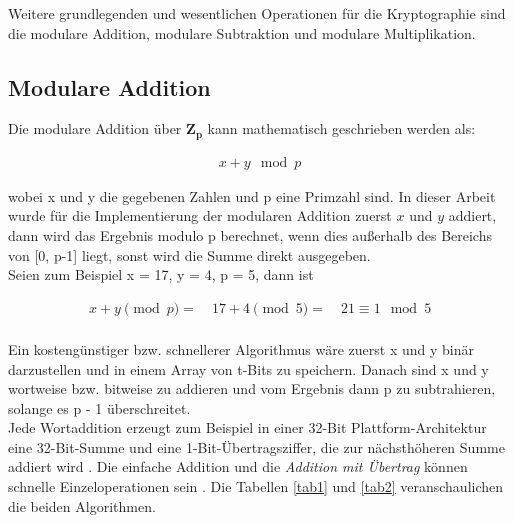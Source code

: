 Weitere grundlegenden und wesentlichen Operationen für die
Kryptographie sind die modulare Addition, modulare Subtraktion und modulare Multiplikation. 


\subsection{Modulare Addition}


Die modulare Addition über $ \mathbf{Z_p} $ kann mathematisch
geschrieben werden als:

\begin{ceqn}
\begin{align*}
    x + y \mod p 
\end{align*}
\end{ceqn} wobei x und y die
gegebenen Zahlen und p eine Primzahl sind. In dieser Arbeit wurde für die Implementierung der modularen Addition zuerst $ x $ und $ y $ 
addiert, dann wird das Ergebnis modulo p berechnet, wenn dies außerhalb des Bereichs von [0, p-1] liegt, sonst wird die Summe direkt ausgegeben. \\

Seien zum Beispiel x = 17, y = 4, p = 5, dann ist
\begin{ceqn}

\begin{align*}
   x + y \pmod p = \quad 17 + 4 \pmod 5 = \quad 21 \equiv 1 \mod 5 \\
\end{align*}
\end{ceqn}
Ein kostengünstiger bzw. schnellerer Algorithmus wäre zuerst x und y binär darzustellen und in einem Array von t-Bits zu speichern.
Danach sind x und y wortweise bzw.
bitweise zu addieren und vom Ergebnis dann p zu subtrahieren, solange es p - 1 überschreitet. \\

Jede Wortaddition erzeugt zum Beispiel in einer 32-Bit Plattform-Architektur eine 32-Bit-Summe und eine 1-Bit-Übertragsziffer, die zur
nächsthöheren Summe addiert wird \cite{nist}. Die einfache Addition und die \textit{Addition mit Übertrag} können schnelle Einzeloperationen sein \cite{Hossain2019}. Die Tabellen \ref{tab1} und \ref{tab2} veranschaulichen die beiden Algorithmen. 

